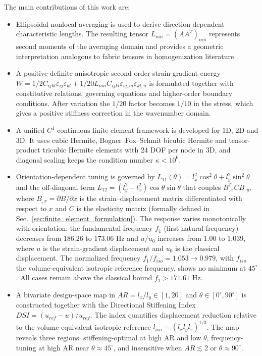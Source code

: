 \documentclass[final,3p,times,fleqn]{elsarticle}
\begin{document}
The main contributions of this work are:
\begin{itemize}
  \item Ellipsoidal nonlocal averaging is used to derive direction-dependent characteristic lengths. The resulting tensor $L_{mn}=(AA^T)_{mn}$ represents second moments of the averaging domain and provides a geometric interpretation analogous to fabric tensors in homogenization literature \cite{LazarPo2015,Polizzotto2018,Auffray2019}.
  \item A positive-definite anisotropic second-order strain-gradient energy $W=1/2 C_{ijkl}\varepsilon_{ij}\varepsilon_{kl}+1/20 L_{mn}C_{ijkl}\varepsilon_{ij,m}\varepsilon_{kl,n}$ is formulated together with constitutive relations, governing equations and higher-order boundary conditions. After variation the $1/20$ factor becomes $1/10$ in the stress, which gives a positive stiffness correction in the wavenumber domain.
  \item A unified $C^{1}$-continuous finite element framework is developed for 1D, 2D and 3D. It uses cubic Hermite, Bogner--Fox--Schmit bicubic Hermite and tensor-product tricubic Hermite elements with 24 DOF per node in 3D, and diagonal scaling keeps the condition number $\kappa<10^6$.
  \item Orientation-dependent tuning is governed by $L_{11}(\theta)=l_x^2\cos^2\theta+l_y^2\sin^2\theta$ and the off-diagonal term $L_{12}=(l_y^2-l_x^2)\cos\theta\sin\theta$ that couples $B_{,x}^T C B_{,y}$, where $B_{,x}=\partial B/\partial x$ is the strain--displacement matrix differentiated with respect to $x$ and $C$ is the elasticity matrix (formally defined in Sec.~\ref{sec:finite_element_formulation}). The response varies monotonically with orientation: the fundamental frequency $f_1$ (first natural frequency) decreases from $186.26$ to $173.06$ Hz and $u/u_0$ increases from $1.00$ to $1.039$, where $u$ is the strain-gradient displacement and $u_0$ is the classical displacement. The normalized frequency $f_1/f_{iso}=1.053\to0.979$, with $f_{iso}$ the volume-equivalent isotropic reference frequency, shows no minimum at $45^\circ$. All cases remain above the classical bound $f_1>171.61$ Hz.
  \item A bivariate design-space map in $AR=l_x/l_y\in[1,20]$ and $\theta\in[0^\circ,90^\circ]$ is constructed together with the Directional Stiffening Index $DSI=(u_{ref}-u)/u_{ref}$. The index quantifies displacement reduction relative to the volume-equivalent isotropic reference $l_{iso}=(l_xl_yl_z)^{1/3}$. The map reveals three regions: stiffening-optimal at high AR and low $\theta$, frequency-tuning at high AR near $\theta\approx45^\circ$, and insensitive when $AR\lesssim2$ or $\theta\approx90^\circ$.
\end{itemize}
\end{document}
